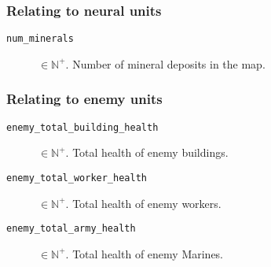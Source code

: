 \subsubsection*{Relating to neural units}
\begin{description}
    \item[\texttt{num\_minerals}] $\in \mathbb{N}^+$. Number of mineral deposits in the map.
\end{description}

\subsubsection*{Relating to enemy units}
\begin{description}
    \item[\texttt{enemy\_total\_building\_health}] $\in \mathbb{N}^+$. Total health of enemy buildings.
    \item[\texttt{enemy\_total\_worker\_health}] $\in \mathbb{N}^+$. Total health of enemy workers.
    \item[\texttt{enemy\_total\_army\_health}] $\in \mathbb{N}^+$. Total health of enemy Marines.
\end{description}